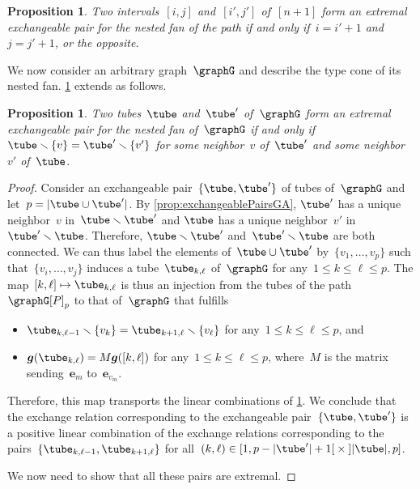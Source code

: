 \documentclass{amsart}
\newtheorem{proposition}[theorem]{Proposition}
\theoremstyle{definition}
\renewcommand{\b}[1]{{\boldsymbol{#1}}} %
\newcommand{\ssm}{\smallsetminus} %
\newcommand{\symdif}{\,\triangle\,} %
\newcommand{\vincent}[1]{\todo[color=blue!30]{#1 \\ \hfill --- V.}}
\newcommand{\gvector}[1]{\b{g}(#1)} %
\begin{document}
\begin{proposition}
\label{prop:extremalExchangeablePairsA}
Two intervals~$[i,j]$ and~$[i',j']$ of~$[n+1]$ form an extremal exchangeable pair for the nested fan of the path if and only if~$i = i'+1$ and~$j = j'+1$, or the opposite.
\end{proposition}

We now consider an arbitrary graph~$\graphG$ and describe the type cone of its nested fan.
\cref{prop:extremalExchangeablePairsA} extends as follows.

\begin{proposition}
\label{prop:extremalExchangeablePairsGA}
Two tubes~$\tube$ and~$\tube'$ of~$\graphG$ form an extremal exchangeable pair for the nested fan of~$\graphG$ if and only if~${\tube \ssm \{v\} = \tube' \ssm \{v'\}}$ for some neighbor~$v$ of~$\tube'$ and some neighbor~$v'$ of~$\tube$.
\end{proposition}

\begin{proof}
Consider an exchangeable pair~$\{\tube, \tube'\}$ of tubes of~$\graphG$ and let~$p = |\tube \cup \tube'|$.
By \cref{prop:exchangeablePairsGA}, $\tube'$ has a unique neighbor~$v$ in~$\tube \ssm \tube'$ and $\tube$ has a unique neighbor~$v'$ in~$\tube' \ssm \tube$.
Therefore, $\tube \ssm \tube'$ and~$\tube' \ssm \tube$ are both connected.
We can thus label the elements of~$\tube \cup \tube'$ by~$\{v_1, \dots, v_p\}$ such that~$\{v_i, \dots, v_j\}$ induces a tube~$\tube_{k,\ell}$ of~$\graphG$ for any~$1 \le k \le \ell \le p$. 
The map~$[k,\ell] \mapsto \tube_{k,\ell}$ is thus an injection from the tubes of the path~$\graphG[P]_p$ to that of~$\graphG$ that fulfills
\begin{itemize}
\item $\tube_{k,\ell-1} \ssm \{v_k\} = \tube_{k+1,\ell} \ssm \{v_\ell\}$ for any~$1 \le k \le \ell \le p$, and
\item $\gvector{\tube_{k,\ell}} = M\gvector{[k,\ell]}$ for any~$1 \le k \le \ell \le p$, where~$M$ is the matrix sending~$\b{e}_m$ to~$\b{e}_{v_m}$.
\end{itemize}
Therefore, this map transports the linear combinations of \cref{prop:extremalExchangeablePairsA}.
We conclude that the exchange relation corresponding to the exchangeable pair~$\{\tube, \tube'\}$ is a positive linear combination of the exchange relations corresponding to the pairs~$\{\tube_{k,\ell-1}, \tube_{k+1,\ell}\}$ for all~${(k,\ell) \in {[1, p-|\tube'|+1[} \times {]|\tube|, p]}}$.

We now need to show that all these pairs are extremal.
\vincent{TODO}
\end{proof}
\end{document}
